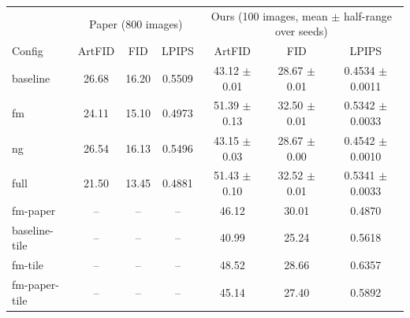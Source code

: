 \begin{tabular}{l|ccc|ccc}
\hline
 & \multicolumn{3}{c|}{Paper (800 images)} & \multicolumn{3}{c}{Ours (100 images, mean $\pm$ half-range over seeds)} \\
Config & ArtFID & FID & LPIPS & ArtFID & FID & LPIPS \\
\hline
baseline & 26.68 & 16.20 & 0.5509 & 43.12 $\pm$ 0.01 & 28.67 $\pm$ 0.01 & 0.4534 $\pm$ 0.0011 \\
fm & 24.11 & 15.10 & 0.4973 & 51.39 $\pm$ 0.13 & 32.50 $\pm$ 0.01 & 0.5342 $\pm$ 0.0033 \\
ng & 26.54 & 16.13 & 0.5496 & 43.15 $\pm$ 0.03 & 28.67 $\pm$ 0.00 & 0.4542 $\pm$ 0.0010 \\
full & 21.50 & 13.45 & 0.4881 & 51.43 $\pm$ 0.10 & 32.52 $\pm$ 0.01 & 0.5341 $\pm$ 0.0033 \\
fm-paper & -- & -- & -- & 46.12 & 30.01 & 0.4870 \\
baseline-tile & -- & -- & -- & 40.99 & 25.24 & 0.5618 \\
fm-tile & -- & -- & -- & 48.52 & 28.66 & 0.6357 \\
fm-paper-tile & -- & -- & -- & 45.14 & 27.40 & 0.5892 \\
\hline
\end{tabular}
